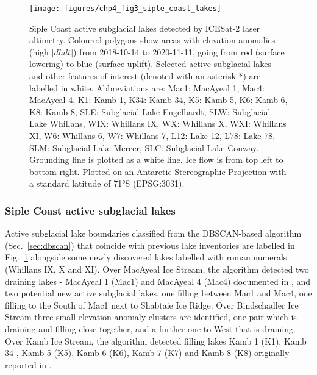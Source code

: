 \begin{figure}[htbp]
  \texttt{[image: figures/chp4\_fig3\_siple\_coast\_lakes]}
  \caption[Siple Coast active subglacial lakes detected by ICESat-2 laser altimetry]{
    Siple Coast active subglacial lakes detected by ICESat-2 laser altimetry.
    Coloured polygons show areas with elevation anomalies (high $|dhdt|$) from 2018-10-14 to 2020-11-11, going from red (surface lowering) to blue (surface uplift).
    Selected active subglacial lakes and other features of interest (denoted with an asterisk *) are labelled in white.
    Abbreviations are: Mac1: MacAyeal 1, Mac4: MacAyeal 4, K1: Kamb 1, K34: Kamb 34, K5: Kamb 5, K6: Kamb 6, K8: Kamb 8, SLE: Subglacial Lake Engelhardt, SLW: Subglacial Lake Whillans, WIX: Whillans IX, WX: Whillans X, WXI: Whillans XI, W6: Whillans 6, W7: Whillans 7, L12: Lake 12, L78: Lake 78, SLM: Subglacial Lake Mercer, SLC: Subglacial Lake Conway.
    Grounding line \citep{DepoorterAntarcticmasksiceshelves2013} is plotted as a white line.
    Ice flow is from top left to bottom right.
    Plotted on an Antarctic Stereographic Projection with a standard latitude of 71°S (EPSG:3031).
  }
  \label{fig:4.3}
\end{figure}

\subsubsection{Siple Coast active subglacial lakes} \label{sec:siple_coast_lakes}

Active subglacial lake boundaries classified from the \gls{DBSCAN}-based algorithm (Sec.~\ref{sec:dbscan}) that coincide with previous lake inventories \citep{Smithinventoryactivesubglacial2009,SiegfriedThirteenyearssubglacial2018} are labelled in Fig.~\ref{fig:4.3} alongside some newly discovered lakes labelled with roman numerals (Whillans IX, X and XI).
Over MacAyeal Ice Stream, the algorithm detected two draining lakes - MacAyeal 1 (Mac1) and MacAyeal 4 (Mac4) documented in \citet{FrickerSynthesizingmultipleremotesensing2010}, and two potential new active subglacial lakes, one filling between Mac1 and Mac4, one filling to the South of Mac1 next to Shabtaie Ice Ridge.
Over Bindschadler Ice Stream three small elevation anomaly clusters are identified, one pair which is draining and filling close together, and a further one to West that is draining.
Over Kamb Ice Stream, the algorithm detected filling lakes Kamb 1 (K1), Kamb 34 \citep[K34, see also][]{KimActivesubglaciallakes2016}, Kamb 5 (K5), Kamb 6 (K6), Kamb 7 (K7) and Kamb 8 (K8) originally reported in \citet{Smithinventoryactivesubglacial2009}.

